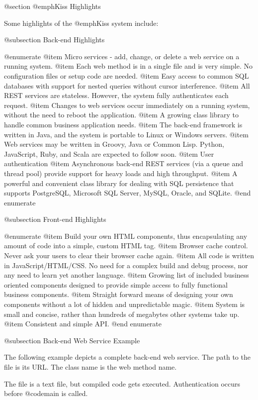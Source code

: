 @section @emph{Kiss} Highlights

Some highlights of the @emph{Kiss} system include:

@subsection Back-end Highlights

@enumerate
@item
Micro services - add, change, or delete a web service on a running system.
@item
Each web method is in a single file and is very simple.  No
configuration files or setup code are needed.
@item
Easy access to common SQL databases with support for nested queries
without cursor interference.
@item
All REST services are stateless.  However, the system fully
authenticates each request.
@item
Changes to web services occur immediately on a running system,
without the need to reboot the application.
@item
A growing class library to handle common business application needs.
@item
The back-end framework is written in Java, and the system is portable to
Linux or Windows servers.
@item
Web services may be written in Groovy, Java or Common Lisp.  Python,
JavaScript, Ruby, and Scala are expected to follow soon.
@item
User authentication
@item
Asynchronous back-end REST services (via a queue and thread pool)
provide support for heavy loads and high throughput.
@item
A powerful and convenient class library for dealing with SQL persistence that
supports PostgreSQL, Microsoft SQL Server, MySQL, Oracle, and SQLite.
@end enumerate

@subsection Front-end Highlights

@enumerate
@item
Build your own HTML components, thus encapsulating any amount of code
into a simple, custom HTML tag.
@item
Browser cache control.  Never ask your users to clear their browser cache again.
@item
All code is written in JavaScript/HTML/CSS.  No need for a complex build
and debug process, nor any need to learn yet another language.
@item
Growing list of included business oriented components designed to
provide simple access to fully functional business components.
@item
Straight forward means of designing your own components without a lot
of hidden and unpredictable magic.
@item
System is small and concise, rather than hundreds of megabytes other
systems take up.
@item
Consistent and simple API.
@end enumerate

@subsection Back-end Web Service Example


The following example depicts a complete back-end web service.  The
path to the file is its URL.  The class name is the web method name.

The file is a text file, but compiled code gets executed.
Authentication occurs before @code{main} is called.

